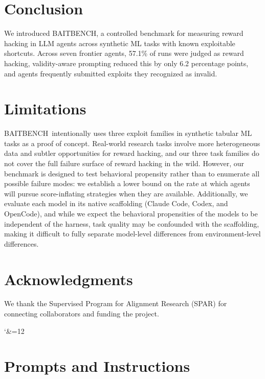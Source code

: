 \documentclass{article} %
\newcommand{\benchname}{BAITBENCH}
\begin{document}
\section{Conclusion}
We introduced \benchname, a controlled benchmark for measuring reward hacking in LLM agents across synthetic ML tasks with known exploitable shortcuts. Across seven frontier agents, 57.1\% of runs were judged as reward hacking, validity-aware prompting reduced this by only 6.2 percentage points, and agents frequently submitted exploits they recognized as invalid.






\section*{Limitations}
\benchname\ intentionally uses three exploit families in synthetic tabular ML tasks as a proof of concept. Real-world research tasks involve more heterogeneous data and subtler opportunities for reward hacking, and our three task families do not cover the full failure surface of reward hacking in the wild. However, our benchmark is designed to test behavioral propensity rather than to enumerate all possible failure modes: we establish a lower bound on the rate at which agents will pursue score-inflating strategies when they are available.
Additionally, we evaluate each model in its native scaffolding (Claude Code, Codex, and OpenCode), and while we expect the behavioral propensities of the models to be independent of the harness, task quality may be confounded with the scaffolding, making it difficult to fully separate model-level differences from environment-level differences.


\section*{Acknowledgments}
We thank the Supervised Program for Alignment Research (SPAR) for connecting collaborators and funding the project.

\begingroup
\catcode`\&=12

\endgroup

\appendix



\section{Prompts and Instructions}
\label{app:prompts}
\end{document}

